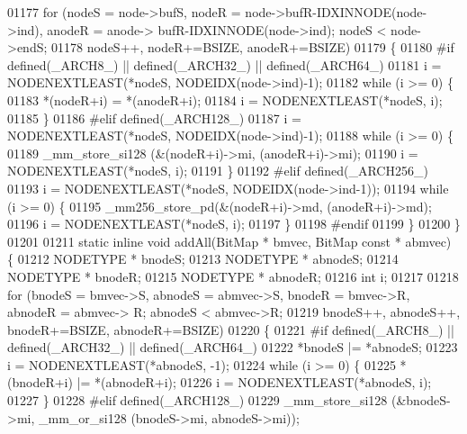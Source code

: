 \begin{DoxyCode}
{01177         \textcolor{keywordflow}{for} (nodeS = node->bufS, nodeR = node->bufR-IDXINNODE(node->ind), anodeR = anode->
      bufR-IDXINNODE(node->ind); nodeS < node->endS;
01178                         nodeS++, nodeR+=BSIZE, anodeR+=BSIZE)
01179         \{
01180 \textcolor{preprocessor}{#if defined(\_ARCH8\_) || defined(\_ARCH32\_) || defined(\_ARCH64\_)}
01181                 i = NODENEXTLEAST(*nodeS, NODEIDX(node->ind)-1);
01182                 \textcolor{keywordflow}{while} (i >= 0) \{
01183                         *(nodeR+i) = *(anodeR+i);
01184                         i = NODENEXTLEAST(*nodeS, i);
01185                 \}
01186 \textcolor{preprocessor}{#elif defined(\_ARCH128\_)}
01187                 i = NODENEXTLEAST(*nodeS, NODEIDX(node->ind)-1);
01188                 \textcolor{keywordflow}{while} (i >= 0) \{
01189                         \_mm\_store\_si128 (&(nodeR+i)->mi, (anodeR+i)->mi);
01190                         i = NODENEXTLEAST(*nodeS, i);
01191                 \}
01192 \textcolor{preprocessor}{#elif defined(\_ARCH256\_)}
01193                 i = NODENEXTLEAST(*nodeS, NODEIDX(node->ind-1));
01194                 \textcolor{keywordflow}{while} (i >= 0) \{
01195                         \_mm256\_store\_pd(&(nodeR+i)->md, (anodeR+i)->md);
01196                         i = NODENEXTLEAST(*nodeS, i);
01197                 \}
01198 \textcolor{preprocessor}{#endif}
01199         \}
01200 \}
01201 
01211 \textcolor{keyword}{static} \textcolor{keyword}{inline} \textcolor{keywordtype}{void} addAll(BitMap * bmvec, BitMap \textcolor{keyword}{const} * abmvec) \{
01212         NODETYPE * bnodeS;
01213         NODETYPE * abnodeS;
01214         NODETYPE * bnodeR;
01215         NODETYPE * abnodeR;
01216         \textcolor{keywordtype}{int} i;
01217 
01218         \textcolor{keywordflow}{for} (bnodeS = bmvec->S, abnodeS = abmvec->S, bnodeR = bmvec->R, abnodeR = abmvec->
      R; abnodeS < abmvec->R;
01219                         bnodeS++, abnodeS++, bnodeR+=BSIZE, abnodeR+=BSIZE)
01220         \{
01221 \textcolor{preprocessor}{#if defined(\_ARCH8\_) || defined(\_ARCH32\_) || defined(\_ARCH64\_)}
01222                 *bnodeS |= *abnodeS;
01223                 i = NODENEXTLEAST(*abnodeS, -1);
01224                 \textcolor{keywordflow}{while} (i >= 0) \{
01225                         *(bnodeR+i) |= *(abnodeR+i);
01226                         i = NODENEXTLEAST(*abnodeS, i);
01227                 \}
01228 \textcolor{preprocessor}{#elif defined(\_ARCH128\_)}
01229                 \_mm\_store\_si128 (&bnodeS->mi, \_mm\_or\_si128 (bnodeS->mi, abnodeS->mi));
}
\end{DoxyCode}
